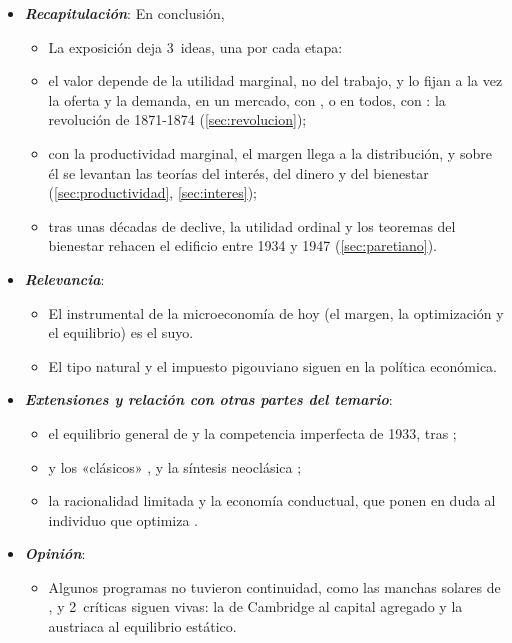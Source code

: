 \documentclass[11pt]{article}
\begin{document}
\begin{itemize}
\item \textbf{\emph{Recapitulación}}: En conclusión,
  \begin{itemize}
  \item La exposición deja 3~ideas, una por cada etapa:
  \item el valor depende de la utilidad marginal, no del trabajo, y lo fijan a la vez la oferta y la demanda, en un mercado, con , o en todos, con : la revolución de 1871-1874 (\ref{sec:revolucion});
  \item con la productividad marginal, el margen llega a la distribución, y sobre él se levantan las teorías del interés, del dinero y del bienestar (\ref{sec:productividad}, \ref{sec:interes});
  \item tras unas décadas de declive, la utilidad ordinal y los teoremas del bienestar rehacen el edificio entre 1934 y 1947 (\ref{sec:paretiano}).
  \end{itemize}
\item \textbf{\emph{Relevancia}}:
  \begin{itemize}
  \item El instrumental de la microeconomía de hoy (el margen, la optimización y el equilibrio) es el suyo.
  \item El tipo natural y el impuesto pigouviano siguen en la política económica.
  \end{itemize}
\item \textbf{\emph{Extensiones y relación con otras partes del temario}}:
  \begin{itemize}
  \item el equilibrio general de \textcite{ArrowDebreu1954Existence}  y la competencia imperfecta de 1933, tras  ;
  \item {} y los «clásicos» , y la síntesis neoclásica ;
  \item la racionalidad limitada y la economía conductual, que ponen en duda al individuo que optimiza .
  \end{itemize}
\item \textbf{\emph{Opinión}}:
  \begin{itemize}
  \item Algunos programas no tuvieron continuidad, como las manchas solares de , y 2~críticas siguen vivas: la de Cambridge al capital agregado  y la austriaca al equilibrio estático\nocite{Hayek1948Meaning}.


\end{itemize}
\end{itemize}
\end{document}
